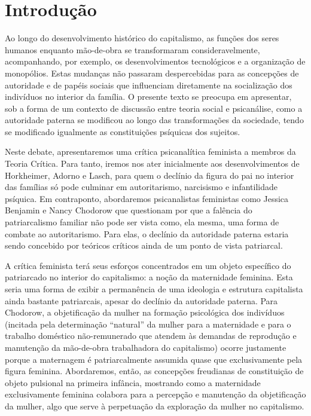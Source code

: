 \section{Introdução}

Ao longo do desenvolvimento histórico do capitalismo, as funções dos
seres humanos enquanto mão-de-obra se transformaram consideravelmente,
acompanhando, por exemplo, os desenvolvimentos tecnológicos e a
organização de monopólios. Estas mudanças não passaram despercebidas
para as concepções de autoridade e de papéis sociais que influenciam
diretamente na socialização dos indivíduos no interior da família. O
presente texto se preocupa em apresentar, sob a forma de um contexto de
discussão entre teoria social e psicanálise, como a autoridade paterna
se modificou ao longo das transformações da sociedade, tendo se
modificado igualmente as constituições psíquicas dos sujeitos.

Neste debate, apresentaremos uma crítica psicanalítica feminista a
membros da Teoria Crítica. Para tanto, iremos nos ater inicialmente aos
desenvolvimentos de Horkheimer, Adorno e Lasch, para quem o declínio da
figura do pai no interior das famílias só pode culminar em
autoritarismo, narcisismo e infantilidade psíquica. Em contraponto,
abordaremos psicanalistas feministas como Jessica Benjamin e Nancy
Chodorow que questionam por que a falência do patriarcalismo familiar
não pode ser vista como, ela mesma, uma forma de combate ao
autoritarismo. Para elas, o declínio da autoridade paterna estaria sendo
concebido por teóricos críticos ainda de um ponto de vista patriarcal.

A crítica feminista terá seus esforços concentrados em um objeto
específico do patriarcado no interior do capitalismo: a noção da
maternidade feminina. Esta seria uma forma de exibir a permanência de
uma ideologia e estrutura capitalista ainda bastante patriarcais, apesar
do declínio da autoridade paterna. Para Chodorow, a objetificação da
mulher na formação psicológica dos indivíduos (incitada pela
determinação ``natural'' da mulher para a maternidade e para o trabalho
doméstico não-remunerado que atendem às demandas de reprodução e
manutenção da mão-de-obra trabalhadora do capitalismo) ocorre justamente
porque a maternagem é patriarcalmente assumida quase que exclusivamente
pela figura feminina. Abordaremos, então, as concepções freudianas de
constituição de objeto pulsional na primeira infância, mostrando como a
maternidade exclusivamente feminina colabora para a percepção e
manutenção da objetificação da mulher, algo que serve à perpetuação da
exploração da mulher no capitalismo.

